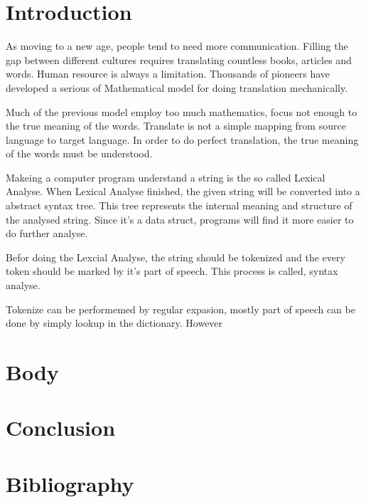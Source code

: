 \section{Introduction}

As moving to a new age, people tend to need more communication. Filling the gap between different cultures requires translating countless books, articles and words. Human resource is always a limitation. Thousands of 
pioneers have developed a serious of Mathematical model for doing translation mechanically. 

Much of the previous model employ too much mathematics, focus not enough to the true meaning of the words.
Translate is not a simple mapping from source language to target language. In order to do perfect translation,
the true meaning of the words must be understood. 

Makeing a computer program understand a string is the so called Lexical Analyse. 
When Lexical Analyse finished, the given string will be converted into a abstract syntax tree. 
This tree represents the internal meaning and structure of the analysed string. Since it's a data struct, programs 
will find it more easier to do further analyse.\cite{Compilers_Principles_Techniques_and_Tools}

Befor doing the Lexcial Analyse, the string should be tokenized and the every token should be marked by it's part of speech.
This process is called, syntax analyse.

Tokenize can be performemed by regular expasion, mostly part of speech can be done by simply lookup in the dictionary. However

\section{Body}

\section{Conclusion}
\section{Bibliography}




